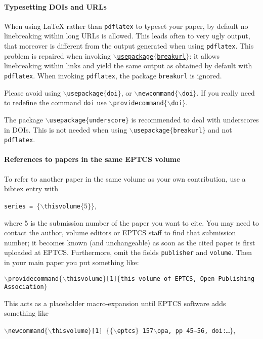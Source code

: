 \documentclass[submission,copyright,creativecommons]{eptcs}
\begin{document}
\paragraph{Typesetting DOIs and URLs}

When using {\LaTeX} rather than {\tt pdflatex} to typeset your paper, by
default no linebreaking within long URLs is allowed. This leads often
to very ugly output, that moreover is different from the output
generated when using {\tt pdflatex}. This problem is repaired when
invoking \href{http://eptcs.web.cse.unsw.edu.au/breakurl.sty}
{\tt $\backslash$usepackage$\{$breakurl$\}$}: it allows linebreaking
within links and yield the same output as obtained by default with
{\tt pdflatex}. 
When invoking {\tt pdflatex}, the package {\tt breakurl} is ignored.

Please avoid using {\tt $\backslash$usepackage$\{$doi$\}$}, or
{\tt $\backslash$newcommand$\{\backslash$doi$\}$}.
If you really need to redefine the command {\tt doi}
use {\tt $\backslash$providecommand$\{\backslash$doi$\}$}.

The package {\tt $\backslash$usepackage$\{$underscore$\}$} is
recommended to deal with underscores in DOIs. This is not needed when
using {\tt $\backslash$usepackage$\{$breakurl$\}$} and not {\tt pdflatex}.

\paragraph{References to papers in the same EPTCS volume}

To refer to another paper in the same volume as your own contribution,
use a bibtex entry with
\begin{center}
  {\tt series    = $\{\backslash$thisvolume$\{5\}\}$},
\end{center}
where 5 is the submission number of the paper you want to cite.
You may need to contact the author, volume editors or EPTCS staff to
find that submission number; it becomes known (and unchangeable)
as soon as the cited paper is first uploaded at EPTCS\@.
Furthermore, omit the fields {\tt publisher} and {\tt volume}.
Then in your main paper you put something like:

\noindent
{\small \tt $\backslash$providecommand$\{\backslash$thisvolume$\}$[1]$\{$this
  volume of EPTCS, Open Publishing Association$\}$}

\noindent
This acts as a placeholder macro-expansion until EPTCS software adds
something like

\noindent
{\small \tt $\backslash$newcommand$\{\backslash$thisvolume$\}$[1]%
  $\{\{\backslash$eptcs$\}$ 157$\backslash$opa, pp 45--56, doi:\dots$\}$},
\end{document}
